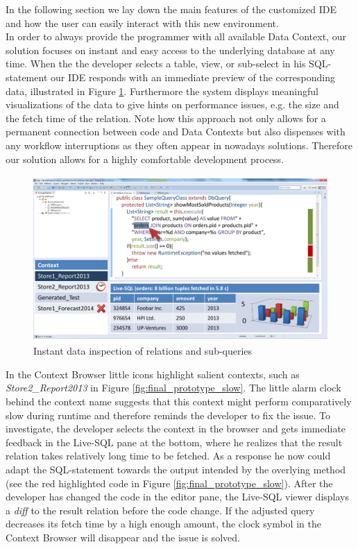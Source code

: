 In the following section we lay down the main features of the customized IDE and how the user can easily interact with this new environment.\\
In order to always provide the programmer with all available Data Context, our solution focuses on instant and easy access to the underlying database at any time. When the the developer selects a table, view, or sub-select in his SQL-statement our IDE responds with an immediate preview of the corresponding data, illustrated in Figure \ref{fig:final_prototype_instant}. Furthermore the system displays meaningful visualizations of the data to give hints on performance issues, e.g. the size and the fetch time of the relation. Note how this approach not only allows for a permanent connection between code and Data Contexts but also dispenses with any workflow interruptions as they often appear in nowadays solutions. Therefore our solution allows for a highly comfortable development process.\\
\begin{figure}
\begin{centering}
    \includegraphics[width=1.0\linewidth]{images/instant}
    \caption{Instant data inspection of relations and sub-queries}
    \label{fig:final_prototype_instant}
\end{centering}
\end{figure}
In the Context Browser little icons highlight salient contexts, such as \emph{Store2\_Report2013} in Figure \ref{fig:final_prototype_slow}. The little alarm clock behind the context name suggests that this context might perform comparatively slow during runtime and therefore reminds the developer to fix the issue. To investigate, the developer selects the context in the browser and gets immediate feedback in the Live-SQL pane at the bottom, where he realizes that the result relation takes relatively long time to be fetched. As a response he now could adapt the SQL-statement towards the output intended by the overlying method (see the red highlighted code in Figure \ref{fig:final_prototype_slow}). After the developer has changed the code in the editor pane, the Live-SQL viewer displays a \emph{diff} to the result relation before the code change. If the adjusted query decreases its fetch time by a high enough amount, the clock symbol in the Context Browser will disappear and the issue is solved.\\
